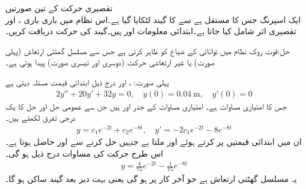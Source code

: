 \quad تقصیری حرکت کے تین صورتیں\\
ایک اسپرنگ جس کا مستقل  ہے سے  کا گیند لٹکایا گیا ہے۔اس نظام میں باری باری ،  اور  تقصیری اثر شامل  کیا جاتا ہے۔ابتدائی معلومات  اور  ہیں۔گیند کی حرکت دریافت کریں۔

حل:قوت روک نظام میں توانائی کے ضیاع کو ظاہر کرتی ہے جس سے مسلسل گھٹتی ارتعاش (پہلی صورت)  یا  غیر ارتعاشی حرکت (دوسری اور تیسری صورت) پیدا ہوتی ہے۔

پہلی صورت: ،  اور   درج ذیل ابتدائی قیمت مسئلہ دیتی ہے
\begin{align*}
2y''+20y'+32y=0, \quad y(0)=\SI{0.04}{\meter}, \quad y'(0)=0
\end{align*}
جس کا امتیازی مساوات  ہے۔ امتیازی مساوات  کے جذر  اور  ہیں جن سے عمومی حل اور حل کا یک درجی تفرق لکھتے ہیں۔
\begin{align*}
y=c_1 e^{-2t}+c_2e^{-8t}, \quad y'=-2c_1e^{-2t}-8e^{-8t}
\end{align*}
ان میں ابتدائی قیمتیں پر کرتے ہوئے   اور  ملتا ہے جنہیں حل کرنے سے  اور 
 حاصل ہوتا ہے۔اس طرح حرکت کی مساوات درج ذیل ہو گی۔
\begin{align*}
y=\frac{4}{75}e^{-2t}-\frac{1}{75}e^{-8t}
\end{align*}
یہ مسلسل گھٹتی ارتعاش ہے جو آخر کار  پر  ہو گی یعنی بہت دیر بعد گیند ساکن ہو گا۔

